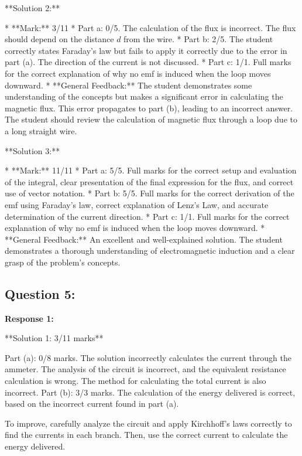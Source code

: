\documentclass[a4paper,11pt]{article}
\begin{document}
**Solution 2:**

* **Mark:** 3/11
    * Part a: 0/5. The calculation of the flux is incorrect. The flux should depend on the distance \( d \) from the wire. 
    * Part b: 2/5. The student correctly states Faraday's law but fails to apply it correctly due to the error in part (a). The direction of the current is not discussed.
    * Part c: 1/1. Full marks for the correct explanation of why no emf is induced when the loop moves downward.
* **General Feedback:** The student demonstrates some understanding of the concepts but makes a significant error in calculating the magnetic flux. This error propagates to part (b), leading to an incorrect answer. The student should review the calculation of magnetic flux through a loop due to a long straight wire.


**Solution 3:**

* **Mark:** 11/11
    * Part a: 5/5. Full marks for the correct setup and evaluation of the integral, clear presentation of the final expression for the flux, and correct use of vector notation.
    * Part b: 5/5. Full marks for the correct derivation of the emf using Faraday's law, correct explanation of Lenz's Law, and accurate determination of the current direction.
    * Part c: 1/1. Full marks for the correct explanation of why no emf is induced when the loop moves downward.
* **General Feedback:** An excellent and well-explained solution. The student demonstrates a thorough understanding of electromagnetic induction and a clear grasp of the problem's concepts.

\subsection*{Question 5:}

\textbf{Response 1:}

**Solution 1: 3/11 marks**

Part (a): 0/8 marks. The solution incorrectly calculates the current through the ammeter. The analysis of the circuit is incorrect, and the equivalent resistance calculation is wrong. The method for calculating the total current is also incorrect.
Part (b): 3/3 marks. The calculation of the energy delivered is correct, based on the incorrect current found in part (a).

To improve, carefully analyze the circuit and apply Kirchhoff's laws correctly to find the currents in each branch. Then, use the correct current to calculate the energy delivered.
\end{document}
